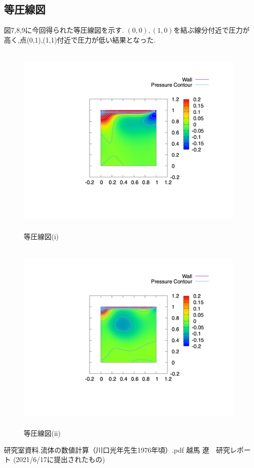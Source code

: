 \documentclass[upLaTeX,a4paper]{jsarticle}
\begin{document}
\subsection{等圧線図}
図7,8,9に今回得られた等圧線図を示す.
$(0,0),(1,0)$を結ぶ線分付近で圧力が高く,点(0,1),(1,1)付近で圧力が低い結果となった.
\begin{figure}[H]
  \centering
  \includegraphics[height=9.5cm, clip,trim=0 200 0 0]{outputs/img/p_re50.png}
  \caption{等圧線図(i)}
  \label{fig:p_re50}
\end{figure}
\begin{figure}[H]
  \centering
  \includegraphics[height=9.5cm, clip,trim=0 200 0 0]{outputs/img/p_re200.png}
  \caption{等圧線図(ii)}
  \label{fig:p_re200}
\end{figure}

\begin{thebibliography}{9}
   研究室資料.流体の数値計算（川口光年先生1976年頃）.pdf
   越馬 遼　研究レポート (2021/6/17に提出されたもの)
\end{thebibliography}
\end{document}
